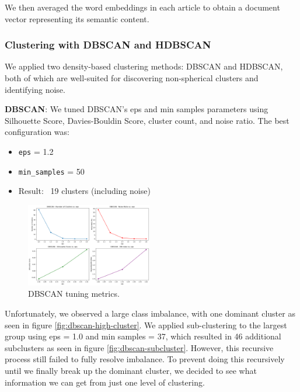 \documentclass[twocolumn]{article}
\begin{document}
We then averaged the word embeddings in each article to obtain a document vector representing its semantic content.

\subsubsection*{Clustering with DBSCAN and HDBSCAN}

We applied two density-based clustering methods: DBSCAN and HDBSCAN, both of which are well-suited for discovering non-spherical clusters and identifying noise.

\textbf{DBSCAN}: We tuned DBSCAN’s eps and min samples parameters using Silhouette Score, Davies-Bouldin Score, cluster count, and noise ratio. The best configuration was:
\begin{itemize}
    \item \texttt{eps} = 1.2
    \item \texttt{min\_samples} = 50
    \item Result: ~19 clusters (including noise)
\end{itemize}

\begin{figure}[h!]
    \centering
    \includegraphics[width=0.49\textwidth]{DBSCAN_tuning_metrics.png}
    \caption{DBSCAN tuning metrics.}
    \label{fig:dbscan-tuning}
\end{figure}


Unfortunately, we observed a large class imbalance, with one dominant cluster as seen in figure \ref{fig:dbscan-high-cluster}. We applied sub-clustering to the largest group using eps = 1.0 and min samples = 37, which resulted in 46 additional subclusters as seen in figure \ref{fig:dbscan-subcluster}. However, this recursive process still failed to fully resolve imbalance. To prevent doing this recursively until we finally break up the dominant cluster, we decided to see what information we can get from just one level of clustering.
\end{document}
